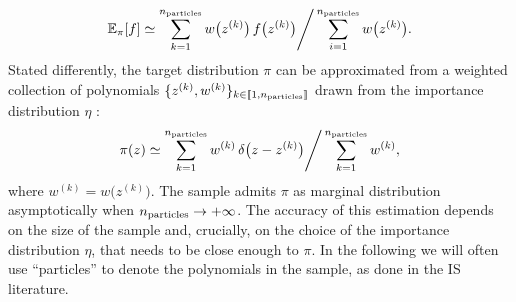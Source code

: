 \documentclass[11pt,a4paper]{article}
\begin{document}
	\begin{equation}
		\mathbb{E}_{\pi}[f] \simeq \displaystyle \sum_{k=1}^{n_{\rm particles}} w\big(z^{(k)}\big)\,f\big(z^{(k)}\big)\Bigg/\displaystyle \sum_{i=1}^{n_{\rm particles}} w\big(z^{(k)}\big).
	\end{equation}
	Stated differently, the target distribution $\pi$ can be approximated from a weighted collection of polynomials $\{z^{(k)},w^{(k)}\}_{k\in\llbracket 1, n_{\rm particles}\rrbracket}$ drawn from the importance distribution $\eta$ :
	\begin{equation}
		\pi(z) \simeq \displaystyle \sum_{k=1}^{n_{\rm particles}} w^{(k)}\,\delta\big(z-z^{(k)}\big)\Bigg/\displaystyle \sum_{k=1}^{n_{\rm particles}} w^{(k)},
	\end{equation}
	where $w^{(k)} = w\big(z^{(k)}\big)$. The sample admits $\pi$ as marginal distribution asymptotically when $n_{\rm particles}\rightarrow+\infty$. The accuracy of this estimation depends on the size of the sample and, crucially, on the choice of the importance distribution $\eta$, that needs to be close enough to $\pi$. In the following we will often use ``particles'' to denote the polynomials in the sample, as done in the IS literature.
	
\end{document}
